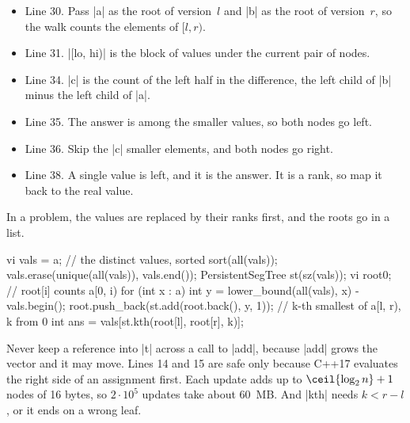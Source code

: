 \begin{notes}
\begin{itemize}
\item Line 30. Pass \code|a| as the root of version~\(l\) and \code|b| as the root of version~\(r\), so the walk counts the elements of \([l, r)\).
\item Line 31. \code|[lo, hi)| is the block of values under the current pair of nodes.
\item Line 34. \code|c| is the count of the left half in the difference, the left child of \code|b| minus the left child of \code|a|.
\item Line 35. The answer is among the smaller values, so both nodes go left.
\item Line 36. Skip the \code|c| smaller elements, and both nodes go right.
\item Line 38. A single value is left, and it is the answer. It is a rank, so map it back to the real value.
\end{itemize}
\end{notes}

In a problem, the values are replaced by their ranks first, and the roots go in a list.

\begin{cpp}[listing options={style=cp,emph={PersistentSegTree,add,kth}}]
vi vals = a;  // the distinct values, sorted
sort(all(vals));
vals.erase(unique(all(vals)), vals.end());
PersistentSegTree st(sz(vals));
vi root{0};  // root[i] counts a[0, i)
for (int x : a) {
  int y = lower_bound(all(vals), x) - vals.begin();
  root.push_back(st.add(root.back(), y, 1));
}
// k-th smallest of a[l, r), k from 0
int ans = vals[st.kth(root[l], root[r], k)];
\end{cpp}

\begin{pitfall}
Never keep a reference into \code|t| across a call to \code|add|, because \code|add| grows the vector and it may move. Lines 14 and 15 are safe only because C++17 evaluates the right side of an assignment first. Each update adds up to \(\ceil{\log_2 n} + 1\) nodes of 16 bytes, so \(2 \cdot 10^5\) updates take about 60~MB. And \code|kth| needs \(k < r - l\), or it ends on a wrong leaf.
\end{pitfall}
